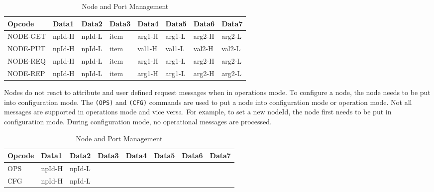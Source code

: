 \begin{table}[ht!]
    \begin{center}
        \caption{Node and Port Management}
        \begin{tabular}{|l|l|l|l|l|l|l|l|}
            \toprule
            \textbf{Opcode} & \textbf{Data1} & \textbf{Data2} & \textbf{Data3} & \textbf{Data4} & \textbf{Data5} & \textbf{Data6} & \textbf{Data7} \\
            \midrule
            NODE-GET & npId-H & npId-L & item & arg1-H & arg1-L & arg2-H & arg2-L \\
            NODE-PUT & npId-H & npId-L & item & val1-H & val1-L & val2-H & val2-L \\
            NODE-REQ & npId-H & npId-L & item & arg1-H & arg1-L & arg2-H & arg2-L \\
            NODE-REP & npId-H & npId-L & item & arg1-H & arg1-L & arg2-H & arg2-L \\
            \bottomrule
        \end{tabular}
    \end{center}
\end{table}

Nodes do not react to attribute and user defined request messages when in operations mode. To configure a node, the node needs to be put into configuration mode. The \texttt{(OPS)} and \texttt{(CFG)} commands are used to put a node into configuration mode or operation mode. Not all messages are supported in operations mode and vice versa. For example, to set a new nodeId, the node first needs to be put in configuration mode. During configuration mode, no operational messages are processed.

\begin{table}[ht!]
    \begin{center}
        \caption{Node and Port Management}
        \begin{tabular}{|l|l|l|l|l|l|l|l|}
            \toprule
            \textbf{Opcode} & \textbf{Data1} & \textbf{Data2} & \textbf{Data3} & \textbf{Data4} & \textbf{Data5} & \textbf{Data6} & \textbf{Data7} \\
            \midrule
            OPS & npId-H & npId-L & & & & & \\
            CFG & npId-H & npId-L & & & & & \\
            \bottomrule
        \end{tabular}
    \end{center}
\end{table}


